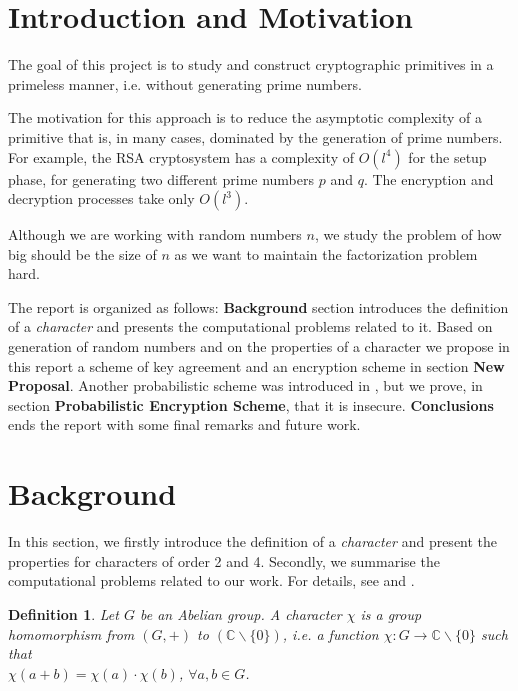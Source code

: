 \documentclass[11pt, a4paper, twoside, openright]{report}
\newtheorem{definition}{Definition}
\begin{document}
\renewcommand*\thesection{\arabic{section}}



\cleardoublepage


\tableofcontents

\clearpage

\section{Introduction and Motivation}

	The goal of this project is to study and construct cryptographic primitives in a primeless manner, 
	i.e. without generating prime numbers. 
	
	The motivation for this approach is to reduce the asymptotic complexity of a primitive that is, 
	in many cases, dominated by the generation of prime numbers. For example, the RSA cryptosystem 
	has a complexity of $O(l^4)$ for the setup phase, for generating two different prime numbers 
	$p$ and $q$. The encryption and decryption processes take only $O(l^3)$. 
	
	Although we are working with random numbers $n$, we study the problem of how big should be 
	the size of $n$ as we want to maintain the factorization problem hard.  

	The report is organized as follows: \textbf{Background} section introduces the definition of a 
	\textit{character} and presents the computational problems related to it. Based on generation
	of random numbers and on the properties of a character we propose in this report a scheme 
	of key agreement and an encryption scheme in section \textbf{New Proposal}. Another probabilistic scheme
	was introduced in \cite{p}, but we prove, in section \textbf{Probabilistic Encryption
	Scheme}, that it is insecure. \textbf{Conclusions} ends the report with some final remarks and 
	future work.  
	
\clearpage

\section{Background}
 	In this section, we firstly introduce the definition of a \textit{character} and present the properties for characters 
 	of order 2 and 4. Secondly, we summarise the computational problems related to our work. 
 	For details, see \cite{book1} and  \cite{mova}. 
 	
 	\begin{definition}
 	Let $G$ be an Abelian group. A character $\chi$ is a group homomorphism from $(G,+)$ to $(\mathbb{C} \backslash \{ 0 \})$, i.e. a function
 	$\chi : G \rightarrow \mathbb{C} \backslash \{ 0 \}$ such that \\
 	
 	\hspace{30mm}  $\chi(a+b)= \chi(a) \cdot \chi(b)$, $\forall a,b \in G$.
 	\end{definition} 
 	
\end{document}
